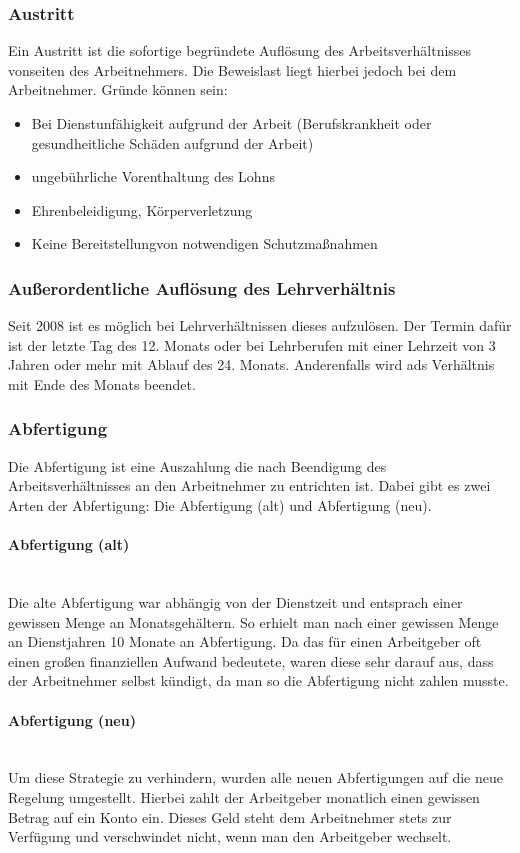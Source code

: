 \documentclass{article}
\newcommand{\paragraphlb}[1]{\paragraph{#1}\mbox{}\\}
\begin{document}
	\subsubsection{Austritt}
	Ein Austritt ist die sofortige begründete Auflösung des Arbeitsverhältnisses vonseiten des Arbeitnehmers. Die Beweislast liegt hierbei jedoch bei dem Arbeitnehmer. Gründe können sein:
	\begin{itemize}
		\item{Bei Dienstunfähigkeit aufgrund der Arbeit (Berufskrankheit oder gesundheitliche Schäden aufgrund der Arbeit)}
		\item{ungebührliche Vorenthaltung des Lohns}
		\item{Ehrenbeleidigung, Körperverletzung}
		\item{Keine Bereitstellungvon notwendigen Schutzmaßnahmen}
	\end{itemize}
	\subsubsection{Außerordentliche Auflösung des Lehrverhältnis}
	Seit 2008 ist es möglich bei Lehrverhältnissen dieses aufzulösen. Der Termin dafür ist der letzte Tag des 12. Monats oder bei Lehrberufen mit einer Lehrzeit von 3 Jahren oder mehr mit Ablauf des 24. Monats. Anderenfalls wird ads Verhältnis mit Ende des Monats beendet.
	\subsubsection{Abfertigung}
	Die Abfertigung ist eine Auszahlung die nach Beendigung des Arbeitsverhältnisses an den Arbeitnehmer zu entrichten ist. Dabei gibt es zwei Arten der Abfertigung: Die Abfertigung (alt) und Abfertigung (neu).
	\paragraphlb{Abfertigung (alt)} 
	Die alte Abfertigung war abhängig von der Dienstzeit und entsprach einer gewissen Menge an Monatsgehältern.  So erhielt man nach einer gewissen Menge an Dienstjahren 10 Monate an Abfertigung. Da das für einen Arbeitgeber oft einen großen finanziellen Aufwand bedeutete, waren diese sehr darauf aus, dass der Arbeitnehmer selbst kündigt, da man so die Abfertigung nicht zahlen musste. 
	\paragraphlb{Abfertigung (neu)}
	Um diese Strategie zu verhindern, wurden alle neuen Abfertigungen auf die neue Regelung umgestellt. Hierbei zahlt der Arbeitgeber monatlich einen gewissen Betrag auf ein Konto ein. Dieses Geld steht dem Arbeitnehmer stets zur Verfügung und verschwindet nicht, wenn man den Arbeitgeber wechselt.
\end{document}
